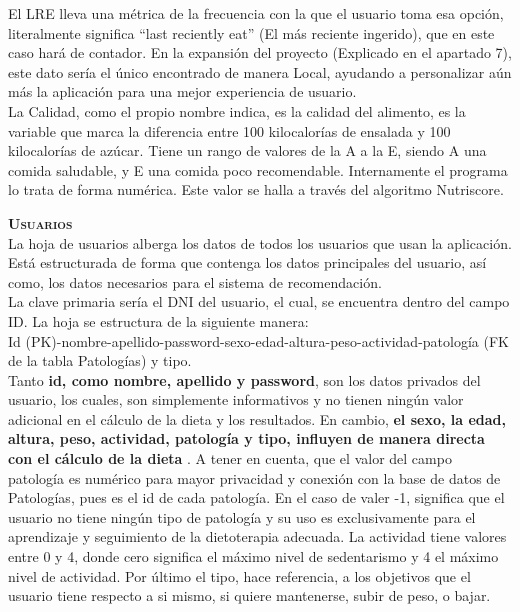 El LRE lleva una métrica de la frecuencia con la que el usuario toma esa opción, literalmente significa “last reciently eat” (El más reciente ingerido), que en este caso hará de contador. En la expansión del proyecto (Explicado en el apartado 7), este dato sería el único encontrado de manera Local, ayudando a personalizar aún más la aplicación para una mejor experiencia de usuario. \\

La Calidad, como el propio nombre indica, es la calidad del alimento, es la variable que marca la diferencia entre 100 kilocalorías de ensalada y 100 kilocalorías de azúcar. Tiene un rango de valores de la A a la E, siendo A una comida saludable, y E una comida poco recomendable. Internamente el programa lo trata de forma numérica. Este valor se halla a través del algoritmo Nutriscore.

\textbf{\textsc{Usuarios}}\\
La hoja de usuarios alberga los datos de todos los usuarios que usan la aplicación. Está estructurada de forma que contenga los datos principales del usuario, así como, los datos necesarios para el sistema de recomendación. \\
La clave primaria sería el DNI del usuario, el cual, se encuentra dentro del campo ID. La hoja se estructura de la siguiente manera:\\
Id (PK)-nombre-apellido-password-sexo-edad-altura-peso-actividad-patología (FK de la tabla Patologías) y tipo.\\
Tanto \textbf{id, como nombre, apellido y password}, son los datos privados del usuario, los cuales, son simplemente informativos y no tienen ningún valor adicional en el cálculo de la dieta y los resultados. En cambio, \textbf{el sexo, la edad, altura, peso, actividad, patología y tipo, influyen de manera directa con el cálculo de la dieta} . A tener en cuenta, que el valor del campo patología es numérico para mayor privacidad y conexión con la base de datos de Patologías, pues es el id de cada patología. En el caso de valer -1, significa que el usuario no tiene ningún tipo de patología y su uso es exclusivamente para el aprendizaje y seguimiento de la dietoterapia adecuada. La actividad tiene valores entre 0 y 4, donde cero significa el máximo nivel de sedentarismo y 4 el máximo nivel de actividad. Por último el tipo, hace referencia, a los objetivos que el usuario tiene respecto a si mismo, si quiere mantenerse, subir de peso, o bajar.\\

